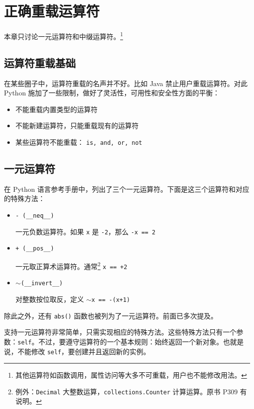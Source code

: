 \section{正确重载运算符}

本章只讨论一元运算符和中缀运算符。\footnote{其他运算符如函数调用，属性访问等大多不可重载，用户也不能修改用法。}

\subsection{运算符重载基础}

在某些圈子中，运算符重载的名声并不好。比如 Java 禁止用户重载运算符。对此 Python 施加了一些限制，做好了灵活性，可用性和安全性方面的平衡：

\begin{itemize}
    \item 不能重载内置类型的运算符
    \item 不能新建运算符，只能重载现有的运算符
    \item 某些运算符不能重载： \texttt{is, and, or, not}
\end{itemize}

\subsection{一元运算符}

在 Python 语言参考手册中，列出了三个一元运算符。下面是这三个运算符和对应的特殊方法：

\begin{itemize}
    \item \texttt{- (\_\_neq\_\_)}
    
    一元负数运算符。如果 \texttt{x} 是 \texttt{-2}，那么 \texttt{-x == 2}
    \item \texttt{+ (\_\_pos\_\_)}
    
    一元取正算术运算符。通常\footnote{例外：\texttt{Decimal} 大整数运算，\texttt{collections.Counter} 计算运算。原书 P309 有说明。} \texttt{x == +2}
    \item \texttt{$\sim$(\_\_invert\_\_)}
    
    对整数按位取反，定义 \texttt{$\sim$x == -(x+1)}
\end{itemize}

除此之外，还有 \texttt{abs()} 函数也被列为了一元运算符。前面已多次提及。

支持一元运算符非常简单，只需实现相应的特殊方法。这些特殊方法只有一个参数：\texttt{self}。不过，要遵守运算符的一个基本规则：始终返回一个新对象。也就是说，不能修改 \texttt{self}，要创建并且返回新的实例。

